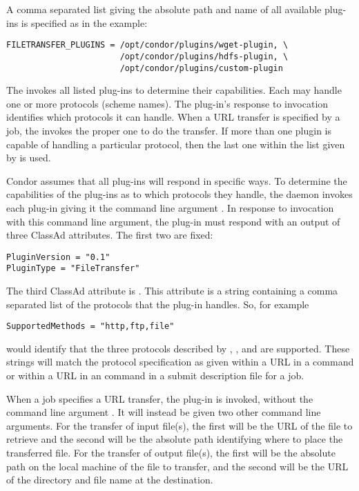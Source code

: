 A comma separated list giving the absolute path and name
of all available plug-ins is specified as in the example:
\footnotesize
\begin{verbatim}
FILETRANSFER_PLUGINS = /opt/condor/plugins/wget-plugin, \
                       /opt/condor/plugins/hdfs-plugin, \
                       /opt/condor/plugins/custom-plugin
\end{verbatim}
\normalsize

The  invokes all listed plug-ins to determine their 
capabilities. Each may handle one or more protocols (scheme names).
The plug-in's response to invocation identifies which protocols
it can handle.
When a URL transfer is specified by a job,
the  invokes the proper one to do the transfer.
If more than one plugin is capable of handling a particular protocol,
then the last one within the list given by 
is used.

Condor assumes that all plug-ins will respond in specific
ways.
To determine the capabilities of the plug-ins as to which protocols
they handle,
the \Condor{starter} daemon invokes each plug-in giving it the
command line argument .
In response to invocation with this command line argument,
the plug-in must respond with an output of three ClassAd attributes. 
The first two are fixed:
\footnotesize
\begin{verbatim}
PluginVersion = "0.1"
PluginType = "FileTransfer"
\end{verbatim}
\normalsize

The third ClassAd attribute is . 
This attribute is a string containing a comma separated list of the
protocols that the plug-in handles.
So, for example
\footnotesize
\begin{verbatim}
SupportedMethods = "http,ftp,file"
\end{verbatim}
\normalsize
would identify that the three protocols described by \verb@http@,
\verb@ftp@, and \verb@file@ are supported.
These strings will match the protocol specification as given
within a URL in a  command
or within a URL in an \SubmitCmd{output\_destination} command 
in a submit description file for a job.

When a job specifies a URL transfer,
the plug-in is invoked, without the command line argument .
It will instead be given two other command line arguments.
For the transfer of input file(s),
the first will be the URL of the file to retrieve
and the second will be the absolute path identifying where to place the
transferred file.
For the transfer of output file(s),
the first will be the absolute path on the local machine of the file
to transfer,
and the second will be the URL of the directory and file name
at the destination.

